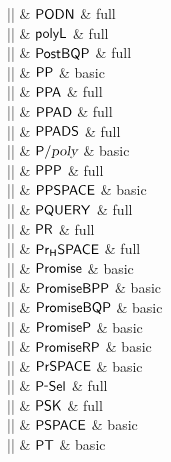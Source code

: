 |\PODN|    & ${\mathsf{PODN}}$ & full \\

|\polyL|    & ${\mathsf{polyL}}$ & full \\

|\PostBQP|    & ${\mathsf{PostBQP}}$ & full \\

|\PP|    & ${\mathsf{PP}}$ & basic \\

|\PPA|    & ${\mathsf{PPA}}$ & full \\

|\PPAD|    & ${\mathsf{PPAD}}$ & full \\

|\PPADS|    & ${\mathsf{PPADS}}$ & full \\

|\Ppoly|    & ${\mathsf{P}}/{\textsl{poly}}$ & basic \\

|\PPP|    & ${\mathsf{PPP}}$ & full \\

|\PPSPACE|    & ${\mathsf{PPSPACE}}$ & basic \\

|\PQUERY|    & ${\mathsf{PQUERY}}$ & full \\

|\PR|    & ${\mathsf{PR}}$ & full \\

|\PrHSPACE|    & ${{\mathsf{Pr}}_{{\mathsf{H}}}{\mathsf{SPACE}}}$ & full \\

|\Promise|    & ${\mathsf{Promise}}$ & basic \\

|\PromiseBPP|    & ${\mathsf{PromiseBPP}}$ & basic \\

|\PromiseBQP|    & ${\mathsf{PromiseBQP}}$ & basic \\

|\PromiseP|    & ${\mathsf{PromiseP}}$ & basic \\

|\PromiseRP|    & ${\mathsf{PromiseRP}}$ & basic \\

|\PrSPACE|    & ${\mathsf{PrSPACE}}$ & basic \\

|\PSel|    & $\PSel$ & full \\

|\PSK|    & ${\mathsf{PSK}}$ & full \\

|\PSPACE|    & ${\mathsf{PSPACE}}$ & basic \\

|\PT|    & ${\mathsf{PT}}$ & basic \\


